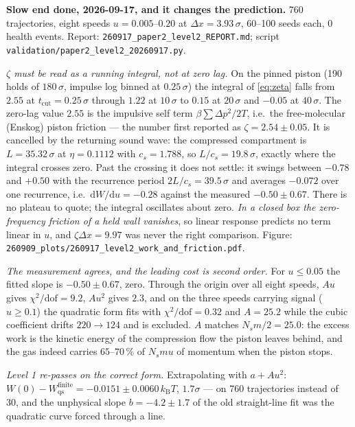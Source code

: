 \documentclass[11pt,a4paper]{article}
\newcommand{\kT}{k_{\mathrm B}T}
\newcommand{\dd}{\mathrm{d}}
\begin{document}
\begin{res}
\textbf{Slow end done, 2026-09-17, and it changes the prediction.} 760 trajectories, eight speeds $u = 0.005$--$0.20$ at $\Delta x = 3.93\,\sigma$, 60--100 seeds each, 0 health events. Report: \texttt{260917\_paper2\_level2\_REPORT.md}; script \texttt{validation/paper2\_level2\_20260917.py}.

\emph{$\zeta$ must be read as a running integral, not at zero lag.} On the pinned piston (190 holds of $180\,\sigma$, impulse log binned at $0.25\,\sigma$) the integral of \eqref{eq:zeta} falls from $2.55$ at $t_{\mathrm{cut}} = 0.25\,\sigma$ through $1.22$ at $10\,\sigma$ to $0.15$ at $20\,\sigma$ and $-0.05$ at $40\,\sigma$. The zero-lag value $2.55$ is the impulsive self term $\beta\sum \Delta p^2/2T$, i.e.\ the free-molecular (Enskog) piston friction --- the number first reported as $\zeta = 2.54 \pm 0.05$. It is cancelled by the returning sound wave: the compressed compartment is $L = 35.32\,\sigma$ at $\eta = 0.1112$ with $c_s = 1.788$, so $L/c_s = 19.8\,\sigma$, exactly where the integral crosses zero. Past the crossing it does not settle: it swings between $-0.78$ and $+0.50$ with the recurrence period $2L/c_s = 39.5\,\sigma$ and averages $-0.072$ over one recurrence, i.e.\ $\dd W/\dd u = -0.28$ against the measured $-0.50 \pm 0.67$. There is no plateau to quote; the integral oscillates about zero. \emph{In a closed box the zero-frequency friction of a held wall vanishes}, so linear response predicts no term linear in $u$, and $\zeta\Delta x = 9.97$ was never the right comparison. Figure: \texttt{260909\_plots/260917\_level2\_work\_and\_friction.pdf}.

\emph{The measurement agrees, and the leading cost is second order.} For $u \le 0.05$ the fitted slope is $-0.50 \pm 0.67$, zero. Through the origin over all eight speeds, $Au$ gives $\chi^2/\mathrm{dof} = 9.2$, $Au^2$ gives $2.3$, and on the three speeds carrying signal ($u \ge 0.1$) the quadratic form fits with $\chi^2/\mathrm{dof} = 0.32$ and $A = 25.2$ while the cubic coefficient drifts $220 \to 124$ and is excluded. $A$ matches $N_s m/2 = 25.0$: the excess work is the kinetic energy of the compression flow the piston leaves behind, and the gas indeed carries $65$--$70\,\%$ of $N_s m u$ of momentum when the piston stops.

\emph{Level 1 re-passes on the correct form.} Extrapolating with $a + Au^2$: $W(0) - W_{\mathrm{qs}}^{\mathrm{finite}} = -0.0151 \pm 0.0060\,\kT$, $1.7\sigma$ --- on 760 trajectories instead of 30, and the unphysical slope $b = -4.2 \pm 1.7$ of the old straight-line fit was the quadratic curve forced through a line.


\end{res}
\end{document}

